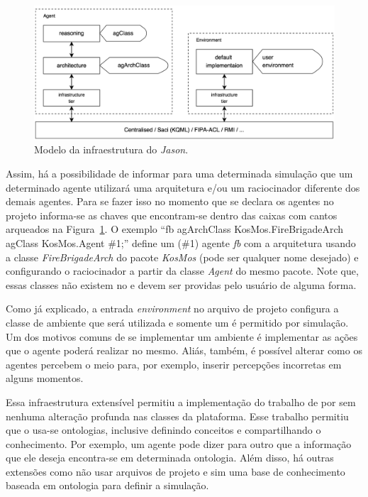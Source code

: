 \begin{figure}
               \begin{center}
               \includegraphics[width=140mm]{figuras/infra.png} 
                \end{center}
                \caption{Modelo da infraestrutura do \emph{Jason}.}
                \label{fig-jason-infra-1}
\end{figure}

Assim, há a possibilidade de informar para uma determinada simulação que um
determinado agente utilizará uma arquitetura e/ou um raciocinador diferente
dos demais agentes. Para se fazer isso no momento que se declara os agentes
no projeto informa-se as chaves que encontram-se dentro das caixas com
cantos arqueados na Figura~\ref{fig-jason-infra-1}. O exemplo
``fb agArchClass KosMos.FireBrigadeArch agClass KosMos.Agent \#1;'' define
um (\#1) agente \emph{fb} com a arquitetura usando a classe \emph{FireBrigadeArch}
do pacote \emph{KosMos} (pode ser qualquer nome desejado) e configurando o
raciocinador a partir da classe \emph{Agent} do mesmo pacote. Note que, essas classes
não existem no \jason e devem ser providas pelo usuário de alguma forma.

Como já explicado, a entrada \emph{environment} no arquivo de projeto
configura a classe de ambiente que será utilizada e somente um
é permitido por simulação. Um dos motivos comuns de se implementar um
ambiente é implementar as ações que o agente poderá realizar no mesmo. Aliás,
também, é possível alterar como os agentes percebem o meio para, por
exemplo, inserir percepções incorretas em alguns momentos.

Essa infraestrutura extensível permitiu a implementação do trabalho de
\citet{moreira2006agent} por \citet{KlaBor09} sem nenhuma alteração profunda
nas classes da plataforma. Esse trabalho permitiu que o \jason usa-se
ontologias, inclusive definindo conceitos e compartilhando o conhecimento. Por
exemplo, um agente pode dizer para outro que a informação que ele deseja
encontra-se em determinada ontologia. Além disso, há outras extensões como
não usar arquivos de projeto e sim uma base de conhecimento baseada em
ontologia para definir a simulação.

